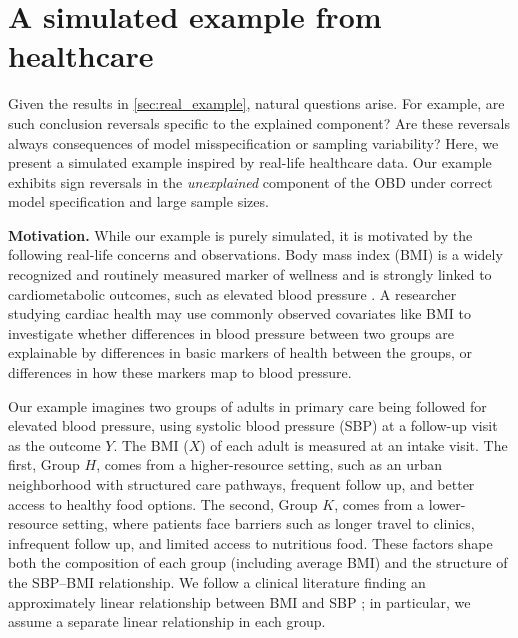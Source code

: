 \section{A simulated example from healthcare}
\label{sec:example}

Given the results in \cref{sec:real_example}, natural questions arise. For example, are such conclusion reversals specific to the explained component? Are these reversals always consequences of model misspecification or sampling variability? Here, we present a simulated example inspired by real-life healthcare data. Our example exhibits sign reversals in the \emph{unexplained} component of the OBD under correct model specification and large sample sizes.


\textbf{Motivation.}
While our example is purely simulated, it is motivated by the following real-life concerns and observations.
Body mass index (BMI) is a widely recognized and routinely measured marker of wellness \cite{heymsfield2016} and is strongly linked to cardiometabolic outcomes, such as elevated blood pressure \cite{brown2000body}.
A researcher studying cardiac health may use commonly observed covariates like BMI to investigate whether differences in blood pressure between two groups are explainable by differences in basic markers of health between the groups, or differences in how these markers map to blood pressure.

Our example imagines two groups of adults in primary care being followed for elevated blood pressure, using systolic blood pressure (SBP) at a follow-up visit as the outcome $Y$. The BMI ($X$) of each adult is measured at an intake visit.
The first, Group $H$, comes from a higher-resource setting, such as an urban neighborhood with structured care pathways, frequent follow up, and better access to healthy food options. 
The second, Group $K$, comes from a lower-resource setting, where patients face barriers such as longer travel to clinics, infrequent follow up, and limited access to nutritious food.
These factors shape both the composition of each group (including average BMI) and the structure of the SBP--BMI relationship. We follow a clinical literature finding an approximately linear relationship between BMI and SBP \cite{kaufman1997, cappuccio2008, chen2023}; in particular, we assume a separate linear relationship in each group.

